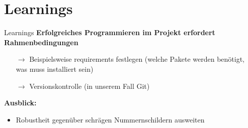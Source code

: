 \section{Learnings}

\begin{frame}{Learnings}
    \textbf{Erfolgreiches Programmieren im Projekt erfordert Rahmenbedingungen}
    \begin{itemize}
        \item[$\rightarrow$] Beispielsweise requirements festlegen (welche Pakete werden ben\"otigt, was muss installiert sein)
        \item[$\rightarrow$] Versionskontrolle (in unserem Fall Git)
    \end{itemize}

    \textbf{Ausblick:}
    \begin{itemize}
        \item Robustheit gegenüber schrägen Nummernschildern ausweiten
    \end{itemize}
\end{frame}

